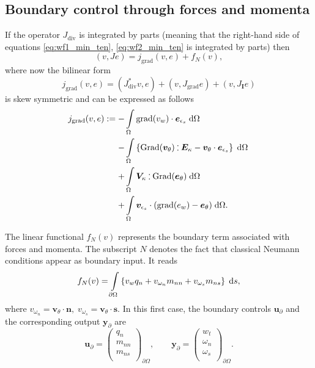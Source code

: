 \documentclass{ifacconf}
\def\onedot{$\mathsurround0pt\ldotp$}
\def\cddot{%
	\mathbin{\vcenter{\baselineskip.67ex
			\hbox{\onedot}\hbox{\onedot}}%
}}
\begin{document}
\subsection{Boundary control through forces and momenta}
\label{subsec:controlForces}
If the operator $J_{\text{div}}$ is integrated by parts (meaning that 
the right-hand side of equations \eqref{eq:wf1_min_ten}, \eqref{eq:wf2_min_ten} is integrated by parts) then 
\begin{equation}
	(v, Je) = j_{\text{grad}}(v, e) + f_{N}(v),
\end{equation}
where now the bilinear form 
\[j_{\text{grad}}(v, e) = (J_{\text{div}}^* v, e) + (v, J_{\text{grad}}e) + (v, J_{\bm{I}} e)\] 
is skew symmetric and can be expressed as follows
\begin{equation} \label{eq:j_allgrad}
\begin{aligned}
j_{\text{grad}}(v, e): =  - &\displaystyle\int_{\Omega} \mathrm{grad}(v_w)  \cdot \bm{e}_{\epsilon_s}  \d\Omega \,   \vspace{2mm}\\
- &\displaystyle\int_{\Omega} \left\{ \mathrm{Grad}(\bm{v}_{\theta}) \cddot \bm{E}_{\kappa} - \bm{v}_{\theta} \cdot \bm{e}_{\epsilon_s}\right\}  \d\Omega \,  \vspace{2mm} \\
+&\displaystyle\int_{\Omega} \bm{V}_{\kappa} \cddot \mathrm{Grad}(\bm{e}_\theta)  \d\Omega \, \vspace{2mm} \\ +&\displaystyle\int_{\Omega} \bm{v}_{\epsilon_s} \cdot (\mathrm{grad}({e}_{w}) - \bm{e}_{\theta})  \d\Omega.
\end{aligned}
\end{equation}

The linear functional $f_{N}(v)$ represents the boundary term associated with forces and momenta. The subscript $N$ denotes the fact that classical Neumann conditions appear as boundary input. It reads
\begin{equation}
f_{N}(v) =  \displaystyle\int_{\partial \Omega} \left\{ v_w q_n +  v_{\omega_n} m_{nn} + v_{\omega_s} m_{ns} \right\}  \d{s},
\end{equation}
where $ v_{\omega_n}=\bm{v}_{\theta} \cdot \bm{n}, \;  v_{\omega_s} = \bm{v}_{\theta} \cdot \bm{s}$. In this first case,  the boundary controls $\bm{u}_\partial$ and the corresponding output $\bm{y}_\partial$ are 
\[\bm{u}_\partial = 
\begin{pmatrix}
{q}_n \\
m_{nn} \\
m_{ns} \\
\end{pmatrix}_{\partial \Omega}, \qquad
\bm{y}_\partial = 
\begin{pmatrix}
w_t \\
\omega_n \\
\omega_s \\
\end{pmatrix}_{\partial \Omega}.
\]
\end{document}

